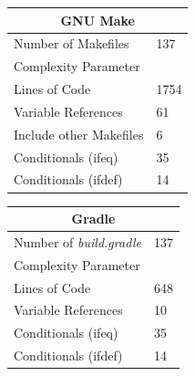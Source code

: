 \documentclass[12pt, a4paper, titlepage]{scrartcl}
\newcommand{\courierword}[1]{\textsf{\itshape #1}}{\fontfamily{pcr}\selectfont}%
\begin{document}
\begin{tabular}{ |l|l| }
	\hline
	\multicolumn{2}{|c|}{GNU Make} \\
	\hline
	Number of Makefiles & 137 \\
	\hline
	Complexity Parameter &  \\
	\hline
	Lines of Code & 1754 \\
	Variable References & 61 \\
	Include other Makefiles & 6 \\
	Conditionals (ifeq) & 35 \\
	Conditionals (ifdef) & 14 \\
	\hline
\end{tabular}
\begin{tabular}{ |l|l| }
	\hline
	\multicolumn{2}{|c|}{Gradle} \\
	\hline
	Number of \courierword{build.gradle} & 137 \\
	\hline
	Complexity Parameter &  \\
	\hline
	Lines of Code & 648 \\
	Variable References & 10 \\
	Conditionals (ifeq) & 35 \\
	Conditionals (ifdef) & 14 \\
	\hline
\end{tabular}
\end{document}
